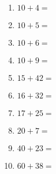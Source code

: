 \documentclass[a4paper,12pt]{article}
\begin{document}
\begin{multicols}{3}
\begin{enumerate}[label=\arabic*.]
    \item \textbf{\Large $10 + 4 =$} \underline{\hspace{1cm}} \vspace{0.5cm} 
    \item \textbf{\Large $10 + 5 =$} \underline{\hspace{1cm}} \vspace{0.5cm} 
    \item \textbf{\Large $10 + 6 =$} \underline{\hspace{1cm}} \vspace{0.5cm} 
    \item \textbf{\Large $10 + 9 =$} \underline{\hspace{1cm}} \vspace{.5cm}
    \item \textbf{\Large $15 + 42 =$} \underline{\hspace{1cm}} \vspace{.5cm}
    \item \textbf{\Large $16 + 32 =$} \underline{\hspace{1cm}} \vspace{.5cm}
    \item \textbf{\Large $17 + 25 =$} \underline{\hspace{1cm}} \vspace{.5cm}
    \item \textbf{\Large $20 + 7 =$} \underline{\hspace{1cm}} \vspace{.5cm}
    \item \textbf{\Large $40 + 23 =$} \underline{\hspace{1cm}} \vspace{.5cm}
    \item \textbf{\Large $60 + 38 =$} \underline{\hspace{1cm}} \vspace{.5cm}
\end{enumerate}

\end{multicols}

\newpage
\end{document}
